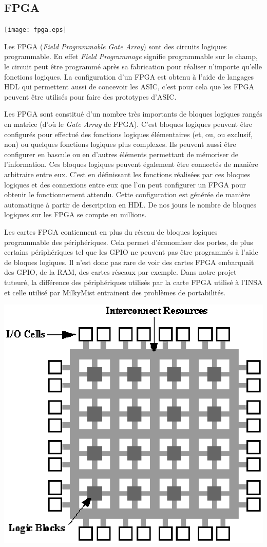 \subsection{FPGA}

\begin{center}
\texttt{[image: fpga.eps]}
\end{center}

Les FPGA (\textit{Field Programmable Gate Array}) sont des circuits logiques
programmable. En effet \textit{Field Programmage} signifie programmable sur le champ,
le circuit peut être programmé après sa fabrication pour réaliser n'importe qu'elle
fonctions logiques. La configuration d'un FPGA est obtenu à l'aide de langages HDL
qui permettent aussi de concevoir les ASIC, c'est pour cela que les FPGA peuvent être
utilisés pour faire des prototypes d'ASIC.

Les FPGA sont constitué d'un nombre très importants de bloques logiques rangés en
matrice (d'où le \textit{Gate Array} de FPGA). C'est bloques logiques peuvent être
configurés pour effectué des fonctions logiques élémentaires (et, ou, ou exclusif,
non) ou quelques fonctions logiques plus complexes. Ils peuvent aussi être configurer
en bascule ou en d'autres éléments permettant de mémoriser de l'information. Ces
bloques logiques peuvent également être connectés de manière arbitraire entre eux.
C'est en définissant les fonctions réalisées par ces bloques logiques et des
connexions entre eux que l'on peut configurer un FPGA pour obtenir le fonctionnement
attendu. Cette configuration est générée de manière automatique à partir de
description en HDL. De nos jours le nombre de bloques logiques sur les FPGA se compte
en millions. 

Les cartes FPGA contiennent en plus du réseau de bloques logiques programmable des
périphériques. Cela permet d'économiser des portes, de plus certains périphériques
tel que les GPIO ne peuvent pas être programmés à l'aide de bloques logiques. Il
n'est donc pas rare de voir des cartes FPGA embarquait des GPIO, de la RAM, des
cartes réseaux par exemple. Dans notre projet tuteuré, la différence des
périphériques utilisés par la carte FPGA utilisé à l'INSA et celle utilisé par
MilkyMist entrainent des problèmes de portabilités.

\begin{center}
\includegraphics[scale=0.5]{porte.eps}
\end{center}